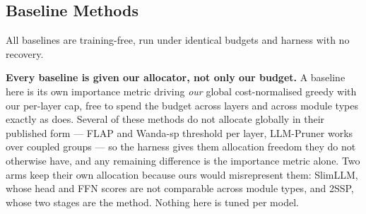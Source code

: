 \subsection{Baseline Methods}

\label{app:baselines}
All baselines are training-free, run under identical budgets and harness with no recovery.

\textbf{Every baseline is given our allocator, not only our budget.} A baseline here is its own
importance metric driving \emph{our} global cost-normalised greedy with our per-layer cap, free to
spend the budget across layers and across module types exactly as \method does. Several of these
methods do not allocate globally in their published form --- FLAP and Wanda-sp threshold per layer,
LLM-Pruner works over coupled groups --- so the harness gives them allocation freedom they do not
otherwise have, and any remaining difference is the importance metric alone. Two arms keep their own
allocation because ours would misrepresent them: SlimLLM, whose head and FFN scores are not comparable
across module types, and 2SSP, whose two stages are the method. Nothing here is tuned per model.

